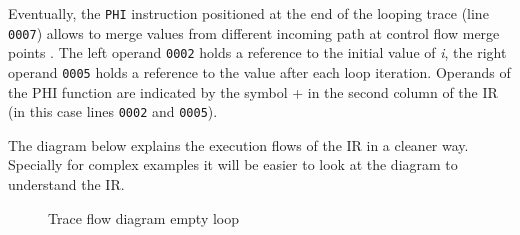 Eventually, the \texttt{PHI} instruction positioned at the end of the looping trace (line \texttt{0007}) allows to merge values from different incoming path at control flow merge points \cite{SSA-form}. The left operand \texttt{0002} holds a reference to the initial value of \textit{i}, the right operand \texttt{0005} holds a reference to the value after each loop iteration. Operands of the PHI function are indicated by the symbol + in the second column of the IR (in this case lines \texttt{0002} and \texttt{0005}).

The diagram below explains the execution flows of the IR in a cleaner way. Specially for complex examples it will be easier to look at the diagram  to understand the IR.

\begin{figure}[H]
\hspace*{3cm}
\vspace*{-2.5cm}
\caption{Trace flow diagram empty loop}
\label{fig:trace-empty}
\end{figure}

